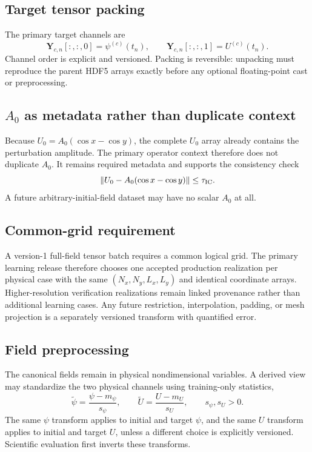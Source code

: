 \documentclass[11pt]{article}
\newcommand{\mat}[1]{\bm{#1}}
\newcommand{\norm}[1]{\left\lVert #1\right\rVert}
\begin{document}
\subsection{Target tensor packing}
The primary target channels are
\begin{equation}
\mat Y_{c,n}[:,:,0]=\psi^{(c)}(t_n),\qquad \mat Y_{c,n}[:,:,1]=U^{(c)}(t_n).
\end{equation}
Channel order is explicit and versioned. Packing is reversible: unpacking must reproduce the parent HDF5 arrays exactly before any optional floating-point cast or preprocessing.

\subsection{$A_0$ as metadata rather than duplicate context}
Because $U_0=A_0(\cos x-\cos y)$, the complete $U_0$ array already contains the perturbation amplitude. The primary operator context therefore does not duplicate $A_0$. It remains required metadata and supports the consistency check
\begin{equation}
\norm{U_0-A_0(\cos x-\cos y)}\le\tau_{\rm IC}.
\end{equation}
A future arbitrary-initial-field dataset may have no scalar $A_0$ at all.

\subsection{Common-grid requirement}
A version-1 full-field tensor batch requires a common logical grid. The primary learning release therefore chooses one accepted production realization per physical case with the same $(N_x,N_y,L_x,L_y)$ and identical coordinate arrays. Higher-resolution verification realizations remain linked provenance rather than additional learning cases. Any future restriction, interpolation, padding, or mesh projection is a separately versioned transform with quantified error.

\subsection{Field preprocessing}
The canonical fields remain in physical nondimensional variables. A derived view may standardize the two physical channels using training-only statistics,
\begin{equation}
\widetilde\psi=\frac{\psi-m_\psi}{s_\psi},\qquad
\widetilde U=\frac{U-m_U}{s_U},\qquad s_\psi,s_U>0.
\end{equation}
The same $\psi$ transform applies to initial and target $\psi$, and the same $U$ transform applies to initial and target $U$, unless a different choice is explicitly versioned. Scientific evaluation first inverts these transforms.
\end{document}
